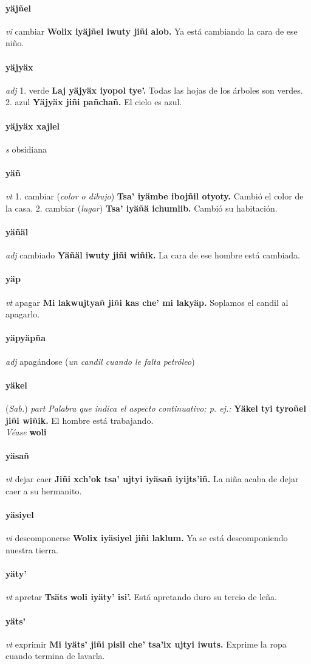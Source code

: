 \documentclass{scrbook}
\newcommand{\entry}[1]{\paragraph{#1}}
\newcommand{\onedefinition}[1]{#1.}
\newcommand{\nontranslationdef}[1]{\textit{#1}}
\newcommand{\partofspeech}[1]{\textit{#1}}
\newcommand{\spanishtranslation}[1]{#1}
\newcommand{\clarification}[1]{(\textit{#1})}
\newcommand{\cholexample}[1]{\textbf{#1}}
\newcommand{\exampletranslation}[1]{#1}
\newcommand{\alsosee}[1]{\\\textit{Véase} \textbf{#1}}
\newcommand{\relevantdialect}[1]{(\textit{#1})}
\begin{document}
\begin{multicols}{2}
\entry{yäjñel}
\partofspeech{vi}
\spanishtranslation{cambiar}
\cholexample{Wolix iyäjñel iwuty jiñi alob.}
\exampletranslation{Ya está cambiando la cara de ese niño.}

\entry{yäjyäx}
\partofspeech{adj}
\onedefinition{1}
\spanishtranslation{verde}
\cholexample{Laj yäjyäx iyopol tye'.}
\exampletranslation{Todas las hojas de los árboles son verdes.}
\onedefinition{2}
\spanishtranslation{azul}
\cholexample{Yäjyäx jiñi pañchañ.}
\exampletranslation{El cielo es azul.}

\entry{yäjyäx xajlel}
\partofspeech{s}
\spanishtranslation{obsidiana}

\entry{yäñ}
\partofspeech{vt}
\onedefinition{1}
\spanishtranslation{cambiar}
\clarification{color o dibujo}
\cholexample{Tsa' iyämbe ibojñil otyoty.}
\exampletranslation{Cambió el color de la casa.}
\onedefinition{2}
\spanishtranslation{cambiar}
\clarification{lugar}
\cholexample{Tsa' iyäñä ichumlib.}
\exampletranslation{Cambió su habitación.}

\entry{yäñäl}
\partofspeech{adj}
\spanishtranslation{cambiado}
\cholexample{Yäñäl iwuty jiñi wiñik.}
\exampletranslation{La cara de ese hombre está cambiada.}

\entry{yäp}
\partofspeech{vt}
\spanishtranslation{apagar}
\cholexample{Mi lakwujtyañ jiñi kas che' mi lakyäp.}
\exampletranslation{Soplamos el candil al apagarlo.}

\entry{yäpyäpña}
\partofspeech{adj}
\spanishtranslation{apagándose}
\clarification{un candil cuando le falta petróleo}

\entry{yäkel}
\relevantdialect{Sab.}
\partofspeech{part}
\nontranslationdef{Palabra que indica el aspecto continuativo; p. ej.:}
\cholexample{Yäkel tyi tyroñel jiñi wiñik.}
\exampletranslation{El hombre está trabajando.}
\alsosee{woli}

\entry{yäsañ}
\partofspeech{vt}
\spanishtranslation{dejar caer}
\cholexample{Jiñi xch'ok tsa' ujtyi iyäsañ iyijts'iñ.}
\exampletranslation{La niña acaba de dejar caer a su hermanito.}

\entry{yäsiyel}
\partofspeech{vi}
\spanishtranslation{descomponerse}
\cholexample{Wolix iyäsiyel jiñi laklum.}
\exampletranslation{Ya se está descomponiendo nuestra tierra.}

\entry{yäty'}
\partofspeech{vt}
\spanishtranslation{apretar}
\cholexample{Tsäts woli iyäty' isi'.}
\exampletranslation{Está apretando duro su tercio de leña.}

\entry{yäts'}
\partofspeech{vt}
\spanishtranslation{exprimir}
\cholexample{Mi iyäts' jiñi pisil che' tsa'ix ujtyi iwuts.}
\exampletranslation{Exprime la ropa cuando termina de lavarla.}


\end{multicols}
\end{document}
